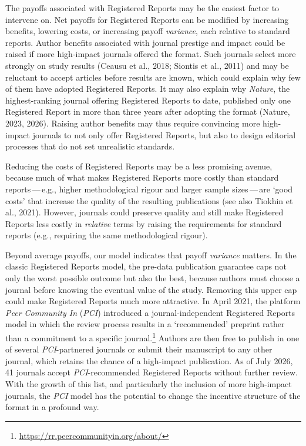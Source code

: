 \documentclass[
  british,
  a4paper,
  ,man,mask,floatsintext]{apa6}
\begin{document}
The payoffs associated with Registered Reports may be the easiest factor to intervene on.
Net payoffs for Registered Reports can be modified by increasing benefits, lowering costs, or increasing payoff \emph{variance}, each relative to standard reports.
Author benefits associated with journal prestige and impact could be raised if more high-impact journals offered the format.
Such journals select more strongly on study results (Ceausu et al., 2018; Siontis et al., 2011) and may be reluctant to accept articles before results are known, which could explain why few of them have adopted Registered Reports.
It may also explain why \emph{Nature}, the highest-ranking journal offering Registered Reports to date, published only one Registered Report in more than three years after adopting the format (Nature, 2023, 2026).
Raising author benefits may thus require convincing more high-impact journals to not only offer Registered Reports, but also to design editorial processes that do not set unrealistic standards.

Reducing the costs of Registered Reports may be a less promising avenue, because much of what makes Registered Reports more costly than standard reports\(\,\)---\(\,\)e.g., higher methodological rigour and larger sample sizes\(\,\)---\(\,\)are `good costs' that increase the quality of the resulting publications (see also Tiokhin et al., 2021).
However, journals could preserve quality and still make Registered Reports less costly in \emph{relative} terms by raising the requirements for standard reports (e.g., requiring the same methodological rigour).

Beyond average payoffs, our model indicates that payoff \emph{variance} matters.
In the classic Registered Reports model, the pre-data publication guarantee caps not only the worst possible outcome but also the best, because authors must choose a journal before knowing the eventual value of the study.
Removing this upper cap could make Registered Reports much more attractive.
In April 2021, the platform \emph{Peer Community In} (\emph{PCI}) introduced a journal-independent Registered Reports model in which the review process results in a `recommended' preprint rather than a commitment to a specific journal.\footnote{\url{https://rr.peercommunityin.org/about/}}
Authors are then free to publish in one of several \emph{PCI}-partnered journals or submit their manuscript to any other journal, which retains the chance of a high-impact publication.
As of July 2026, 41 journals accept \emph{PCI}-recommended Registered Reports without further review.
With the growth of this list, and particularly the inclusion of more high-impact journals, the \emph{PCI} model has the potential to change the incentive structure of the format in a profound way.
\end{document}
